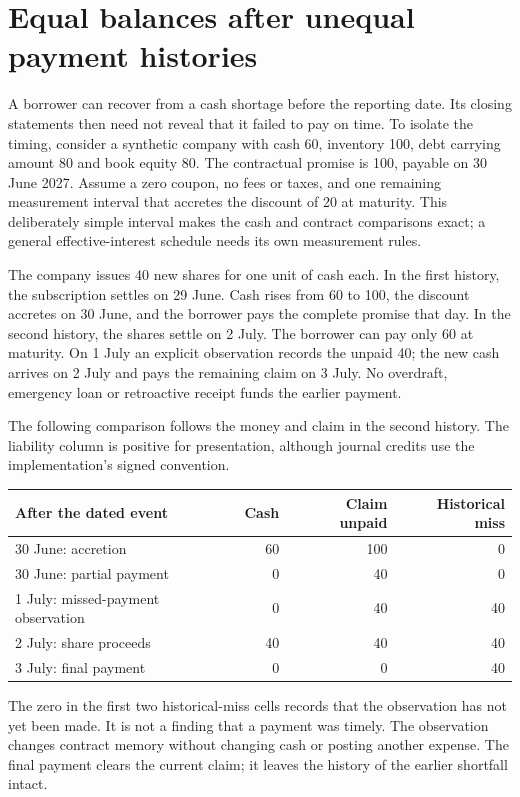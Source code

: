 \section{Equal balances after unequal payment histories}
\label{sim:settlement-remedies}

A borrower can recover from a cash shortage before the reporting date. Its
closing statements then need not reveal that it failed to pay on time. To
isolate the timing, consider a synthetic company with cash 60, inventory 100,
debt carrying amount 80 and book equity 80. The contractual promise is 100,
payable on 30 June 2027. Assume a zero coupon, no fees or taxes, and one
remaining measurement interval that accretes the discount of 20 at maturity.
This deliberately simple interval makes the cash and contract comparisons
exact; a general effective-interest schedule needs its own measurement rules.

The company issues 40 new shares for one unit of cash each. In the first
history, the subscription settles on 29 June. Cash rises from 60 to 100,
the discount accretes on 30 June, and the borrower pays the complete promise
that day. In the second history, the shares settle on 2 July. The borrower
can pay only 60 at maturity. On 1 July an explicit observation records the
unpaid 40; the new cash arrives on 2 July and pays the remaining claim on
3 July. No overdraft, emergency loan or retroactive receipt funds the earlier
payment.

The following comparison follows the money and claim in the second history.
The liability column is positive for presentation, although journal credits
use the implementation's signed convention.
\begin{center}
\begin{tabular}{lrrr}
\toprule
After the dated event & Cash & Claim unpaid & Historical miss\\
\midrule
30 June: accretion &60&100&0\\
30 June: partial payment &0&40&0\\
1 July: missed-payment observation &0&40&40\\
2 July: share proceeds &40&40&40\\
3 July: final payment &0&0&40\\
\bottomrule
\end{tabular}
\end{center}
The zero in the first two historical-miss cells records that the observation
has not yet been made. It is not a finding that a payment was timely. The
observation changes contract memory without changing cash or posting another
expense. The final payment clears the current claim; it leaves the history
of the earlier shortfall intact.

